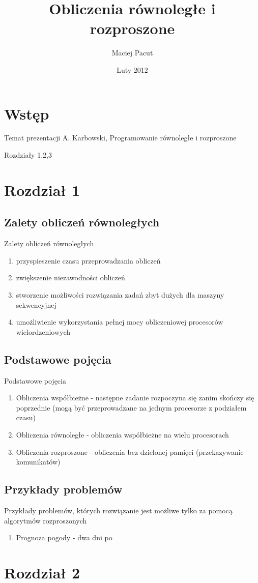 \documentclass{beamer}
\title{Obliczenia równoległe i rozproszone}
\author{Maciej Pacut}
\date{Luty 2012}
\begin{document}
\begin{frame}
  \titlepage
\end{frame}

\section{Wstęp}
\begin{frame}{Temat prezentacji}
  A. Karbowski, Programowanie równoległe i rozproszone

  Rozdziały 1,2,3
\end{frame}

\section{Rozdział 1}
\subsection{Zalety obliczeń równoległych}
\begin{frame}{Zalety obliczeń równoległych}
  \begin{enumerate}
    \item przyspieszenie czasu przeprowadzania obliczeń
    \pause \item zwiększenie niezawodności obliczeń
    \pause \item stworzenie możliwości rozwiązania zadań zbyt dużych dla maszyny sekwencyjnej
    \pause \item umożliwienie wykorzystania pełnej mocy obliczeniowej procesorów wielordzeniowych
  \end{enumerate}
\end{frame}

\subsection{Podstawowe pojęcia}
\begin{frame}{Podstawowe pojęcia}
  \begin{enumerate}
    \item Obliczenia współbieżne - następne zadanie rozpoczyna się zanim skończy się poprzednie (mogą być przeprowadzane na jednym procesorze z podziałem czasu)
    \item Obliczenia równoległe - obliczenia współbieżne na wielu procesorach
    \item Obliczenia rozproszone - obliczenia bez dzielonej pamięci (przekazywanie komunikatów)
  \end{enumerate}
\end{frame}

\subsection{Przykłady problemów}
\begin{frame}{Przykłady problemów, których rozwiązanie jest możliwe tylko za pomocą algorytmów rozproszonych}
  \begin{enumerate}
    \item Prognoza pogody - dwa dni po
  \end{enumerate}
\end{frame}

\section{Rozdział 2}
\end{document}
